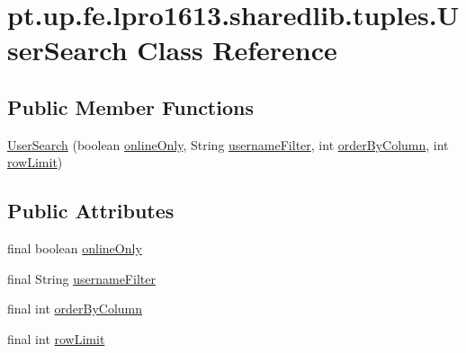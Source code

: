 \hypertarget{classpt_1_1up_1_1fe_1_1lpro1613_1_1sharedlib_1_1tuples_1_1_user_search}{}\section{pt.\+up.\+fe.\+lpro1613.\+sharedlib.\+tuples.\+User\+Search Class Reference}
\label{classpt_1_1up_1_1fe_1_1lpro1613_1_1sharedlib_1_1tuples_1_1_user_search}
\subsection*{Public Member Functions}
\begin{DoxyCompactItemize}
\item 
\hyperlink{classpt_1_1up_1_1fe_1_1lpro1613_1_1sharedlib_1_1tuples_1_1_user_search_ae1f68b5f9c05091269fadda5bb24598e}{User\+Search} (boolean \hyperlink{classpt_1_1up_1_1fe_1_1lpro1613_1_1sharedlib_1_1tuples_1_1_user_search_aa0add11e4d307a21e5b8fdc6b3a05b1a}{online\+Only}, String \hyperlink{classpt_1_1up_1_1fe_1_1lpro1613_1_1sharedlib_1_1tuples_1_1_user_search_ac41460b02d3521bc2f0e9a007e2a51ee}{username\+Filter}, int \hyperlink{classpt_1_1up_1_1fe_1_1lpro1613_1_1sharedlib_1_1tuples_1_1_user_search_a2c03d19a70b2c1c59f6b1895ca296108}{order\+By\+Column}, int \hyperlink{classpt_1_1up_1_1fe_1_1lpro1613_1_1sharedlib_1_1tuples_1_1_user_search_a9f3c8483f8e593708d26fe910968d32f}{row\+Limit})
\end{DoxyCompactItemize}
\subsection*{Public Attributes}
\begin{DoxyCompactItemize}
\item 
final boolean \hyperlink{classpt_1_1up_1_1fe_1_1lpro1613_1_1sharedlib_1_1tuples_1_1_user_search_aa0add11e4d307a21e5b8fdc6b3a05b1a}{online\+Only}
\item 
final String \hyperlink{classpt_1_1up_1_1fe_1_1lpro1613_1_1sharedlib_1_1tuples_1_1_user_search_ac41460b02d3521bc2f0e9a007e2a51ee}{username\+Filter}
\item 
final int \hyperlink{classpt_1_1up_1_1fe_1_1lpro1613_1_1sharedlib_1_1tuples_1_1_user_search_a2c03d19a70b2c1c59f6b1895ca296108}{order\+By\+Column}
\item 
final int \hyperlink{classpt_1_1up_1_1fe_1_1lpro1613_1_1sharedlib_1_1tuples_1_1_user_search_a9f3c8483f8e593708d26fe910968d32f}{row\+Limit}
\end{DoxyCompactItemize}


